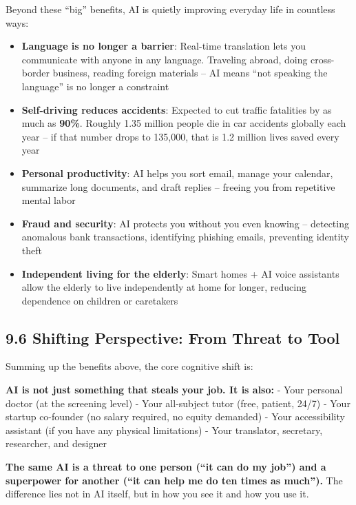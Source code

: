 Beyond these ``big'' benefits, AI is quietly improving everyday life in
countless ways:

\begin{itemize}
\tightlist
\item
  \textbf{Language is no longer a barrier}: Real-time translation lets
  you communicate with anyone in any language. Traveling abroad, doing
  cross-border business, reading foreign materials -- AI means ``not
  speaking the language'' is no longer a constraint
\item
  \textbf{Self-driving reduces accidents}: Expected to cut traffic
  fatalities by as much as \textbf{90\%}. Roughly 1.35 million people
  die in car accidents globally each year -- if that number drops to
  135,000, that is 1.2 million lives saved every year
\item
  \textbf{Personal productivity}: AI helps you sort email, manage your
  calendar, summarize long documents, and draft replies -- freeing you
  from repetitive mental labor
\item
  \textbf{Fraud and security}: AI protects you without you even knowing
  -- detecting anomalous bank transactions, identifying phishing emails,
  preventing identity theft
\item
  \textbf{Independent living for the elderly}: Smart homes + AI voice
  assistants allow the elderly to live independently at home for longer,
  reducing dependence on children or caretakers
\end{itemize}

\subsection{9.6 Shifting Perspective: From Threat to
Tool}\label{shifting-perspective-from-threat-to-tool}

Summing up the benefits above, the core cognitive shift is:

\textbf{AI is not just something that steals your job. It is also:} -
Your personal doctor (at the screening level) - Your all-subject tutor
(free, patient, 24/7) - Your startup co-founder (no salary required, no
equity demanded) - Your accessibility assistant (if you have any
physical limitations) - Your translator, secretary, researcher, and
designer

\textbf{The same AI is a threat to one person (``it can do my job'') and
a superpower for another (``it can help me do ten times as much'').} The
difference lies not in AI itself, but in how you see it and how you use
it.

